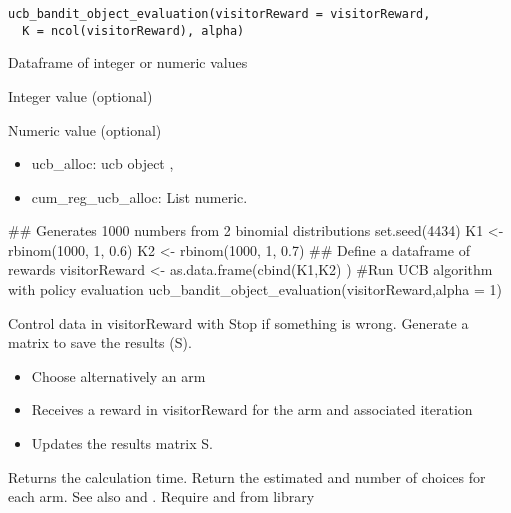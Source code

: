 \documentclass[letterpaper]{book}
\begin{document}
%
\begin{Usage}
\begin{verbatim}
ucb_bandit_object_evaluation(visitorReward = visitorReward,
  K = ncol(visitorReward), alpha)
\end{verbatim}
\end{Usage}
%
\begin{Arguments}
\begin{ldescription}
\item[\code{visitorReward}] Dataframe of integer or numeric values

\item[\code{K}] Integer value (optional)

\item[\code{alpha}] Numeric value (optional)
\end{ldescription}
\end{Arguments}
%
\begin{Value}
\begin{itemize}
 List of element:
\item ucb\_alloc: ucb object ,
\item cum\_reg\_ucb\_alloc: List numeric.

\end{itemize}

\end{Value}
%
\begin{Examples}
\begin{ExampleCode}
## Generates 1000 numbers from 2 binomial distributions
set.seed(4434)
K1 <- rbinom(1000, 1, 0.6)
K2 <- rbinom(1000, 1, 0.7)
## Define a dataframe of rewards
visitorReward <- as.data.frame(cbind(K1,K2) )
#Run UCB algorithm with policy evaluation
ucb_bandit_object_evaluation(visitorReward,alpha = 1)

\end{ExampleCode}
\end{Examples}
%
\begin{Description}\relax
Control data in visitorReward with 
Stop if something is wrong.
Generate a matrix to save the results (S).
\begin{itemize}
 At each iteration
\item Choose alternatively an arm
\item Receives a reward in visitorReward for the arm and associated iteration
\item Updates the results matrix S.

\end{itemize}

Returns the calculation time.
Return the estimated and number of choices for each arm.
See also   and .
Require  and  from  library
\end{Description}
\end{document}
